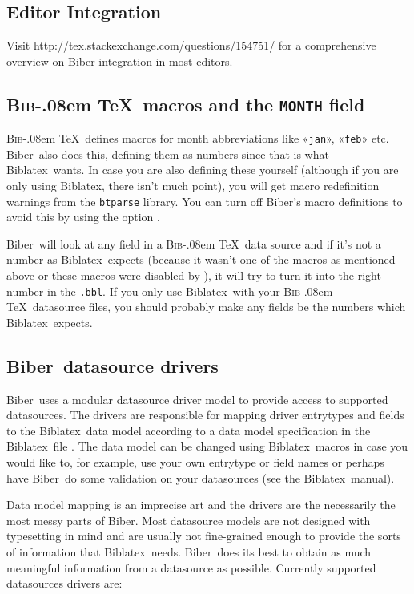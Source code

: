 \documentclass{ltxdockit}
\def\BibTeX{\textsc{Bib}\kern-.08em \TeX}
\newcommand*{\biber}{Biber\xspace}
\newcommand*{\biblatex}{Biblatex\xspace}
\begin{document}
\bigskip
\subsection{Editor Integration}

Visit \url{http://tex.stackexchange.com/questions/154751/} for a
comprehensive overview on \biber integration in most editors.

\subsection{\BibTeX\ macros and the \texttt{MONTH} field}

\BibTeX\ defines macros for month abbreviations
like «\verb+jan+», «\verb+feb+» etc. \biber\ also does this,
defining them as numbers since that is what \biblatex\ wants. In
case you are also defining these yourself (although if you are only
using \biblatex, there isn't much point), you will get macro
redefinition warnings from the \verb+btparse+ library. You can turn
off \biber's macro definitions to avoid this by using the option
.

\biber\ will look at any  field in a \BibTeX\ data
source and if it's not a number as \biblatex\ expects (because it
wasn't one of the macros as mentioned above or these macros were disabled
by ), it will try to turn it into the right number in
the \verb+.bbl+. If you only use \biblatex\ with your \BibTeX\
datasource files, you should probably make any  fields be the
numbers which \biblatex\ expects.

\subsection{\biber\ datasource drivers}\label{dsd}

\biber\ uses a modular datasource driver model to provide access
to supported datasources. The drivers are responsible for mapping
driver entrytypes and fields to the \biblatex\ data model according to a
data model specification in the \biblatex\ file \file{blx-dm.def}. The
data model can be changed using \biblatex\ macros in case you would
like to, for example, use your own entrytype or field names or perhaps
have \biber\ do some validation on your datasources (see the \biblatex\
manual). 

Data model mapping is an imprecise art and the drivers are the
necessarily the most messy parts of \biber. Most datasource models are
not designed with typesetting in mind and are usually not fine-grained
enough to provide the sorts of information that \biblatex\
needs. \biber\ does its best to obtain as much meaningful information
from a datasource as possible. Currently supported datasources
drivers are:
\end{document}
